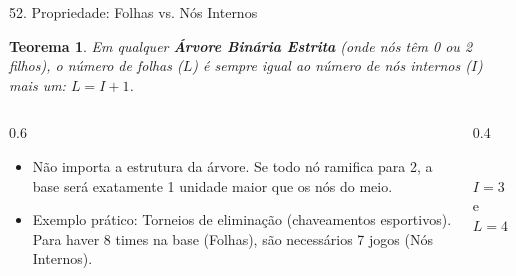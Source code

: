 \documentclass[9pt]{beamer}
\newtheorem{teorema}{Teorema}\usepackage{mathtools}
\begin{document}
    \begin{frame}{52. Propriedade: Folhas vs. Nós Internos}
        \begin{teorema}
            Em qualquer \textbf{Árvore Binária Estrita} (onde nós têm 0 ou 2 filhos), o número de folhas ($L$) é sempre igual ao número de nós internos ($I$) mais um: \textbf{$L = I + 1$}.
        \end{teorema}
        \vspace{0.3cm}
        \begin{columns}
            \begin{column}{0.6\textwidth}
                \begin{itemize}
                    \item Não importa a estrutura da árvore. Se todo nó ramifica para 2, a base será exatamente 1 unidade maior que os nós do meio.
                    \item Exemplo prático: Torneios de eliminação (chaveamentos esportivos). Para haver 8 times na base (Folhas), são necessários 7 jogos (Nós Internos).
                \end{itemize}
            \end{column}
            \begin{column}{0.4\textwidth}
                \centering
                \\
                \vspace{0.2cm}
                \tiny $I=3$ e $L=4$
            \end{column}
        \end{columns}
    \end{frame}
\end{document}
